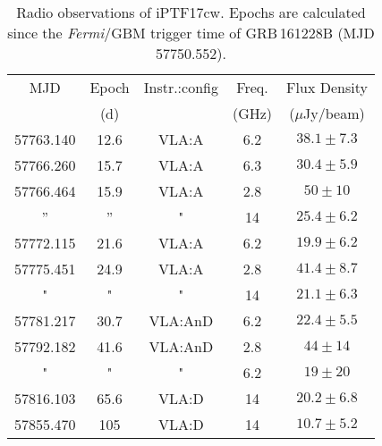 \documentclass[twocolumn]{emulateapj}
\begin{document}
\begin{center}
\begin{longtable}{ccccc}
\caption{Radio observations of iPTF17cw. Epochs are calculated since the \textit{Fermi}/GBM trigger time of GRB\,161228B (MJD 57750.552). \label{radioTab}}
\\
\hline
\hline
MJD & Epoch & Instr.:config & Freq. & Flux Density \\
          &   (d)&    & (GHz)    & ($\mu$Jy/beam)  \\
\hline
\endhead
57763.140 &12.6 &  VLA:A & 6.2 & $38.1\pm7.3$\\
\hline
57766.260 & 15.7 & VLA:A & 6.3 & $30.4\pm5.9$\\
\hline
57766.464 & 15.9 & VLA:A &  2.8  & $50\pm10$  \\
 ''& '' &  " &14   & $25.4\pm6.2$ \\
\hline
 57772.115 & 21.6 & VLA:A & 6.2 & $19.9\pm6.2$\\
 \hline
 57775.451 & 24.9 & VLA:A & 2.8 & $41.4\pm8.7$\\
 "                 &   "     &  "        & 14  & $21.1\pm6.3$\\
 \hline
 57781.217 & 30.7 & VLA:AnD & 6.2 & $22.4\pm5.5$\\
 \hline
57792.182 & 41.6 & VLA:AnD & 2.8 & $44\pm14$\\
" & " & " & 6.2 & $19\pm20$ \\
\hline
 57816.103& 65.6 & VLA:D & 14 & $20.2\pm6.8$\\
\hline
57855.470& 105 & VLA:D & 14 & $10.7\pm5.2$\\
\hline
\end{longtable}
\end{center}
\end{document}

